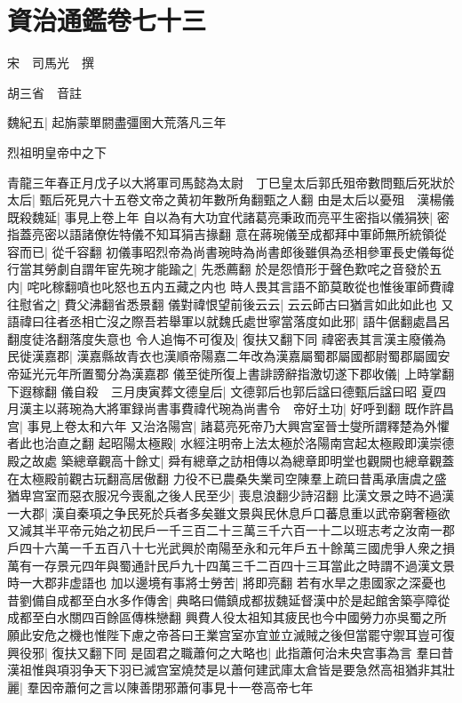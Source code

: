 \chapter{資治通鑑卷七十三}
宋　司馬光　撰

胡三省　音註

魏紀五|{
	起旃蒙單閼盡彊圉大荒落凡三年}


烈祖明皇帝中之下

青龍三年春正月戊子以大將軍司馬懿為太尉　丁巳皇太后郭氏殂帝數問甄后死狀於太后|{
	甄后死見六十五卷文帝之黄初年數所角翻甄之人翻}
由是太后以憂殂　漢楊儀既殺魏延|{
	事見上卷上年}
自以為有大功宜代諸葛亮秉政而亮平生密指以儀狷狹|{
	密指蓋亮密以語諸僚佐特儀不知耳狷吉掾翻}
意在蔣琬儀至成都拜中軍師無所統領從容而已|{
	從千容翻}
初儀事昭烈帝為尚書琬時為尚書郎後雖俱為丞相參軍長史儀每從行當其勞劇自謂年宦先琬才能踰之|{
	先悉薦翻}
於是怨憤形于聲色歎咤之音發於五内|{
	咤叱稼翻噴也叱怒也五内五藏之内也}
時人畏其言語不節莫敢從也惟後軍師費禕往慰省之|{
	費父沸翻省悉景翻}
儀對禕恨望前後云云|{
	云云師古曰猶言如此如此也}
又語禕曰往者丞相亡沒之際吾若舉軍以就魏氏處世寧當落度如此邪|{
	語牛倨翻處昌呂翻度徒洛翻落度失意也}
令人追悔不可復及|{
	復扶又翻下同}
禕密表其言漢主廢儀為民徙漢嘉郡|{
	漢嘉縣故青衣也漢順帝陽嘉二年改為漢嘉屬蜀郡屬國都尉蜀郡屬國安帝延光元年所置蜀分為漢嘉郡}
儀至徙所復上書誹謗辭指激切遂下郡收儀|{
	上時掌翻下遐稼翻}
儀自殺　三月庚寅葬文德皇后|{
	文德郭后也郭后諡曰德甄后諡曰昭}
夏四月漢主以蔣琬為大將軍録尚書事費禕代琬為尚書令　帝好土功|{
	好呼到翻}
既作許昌宫|{
	事見上卷太和六年}
又治洛陽宫|{
	諸葛亮死帝乃大興宫室晉士燮所謂釋楚為外懼者此也治直之翻}
起昭陽太極殿|{
	水經注明帝上法太極於洛陽南宫起太極殿即漢崇德殿之故處}
築總章觀高十餘丈|{
	舜有總章之訪相傳以為總章即明堂也觀闕也總章觀蓋在太極殿前觀古玩翻高居傲翻}
力役不已農桑失業司空陳羣上疏曰昔禹承唐虞之盛猶卑宫室而惡衣服况今喪亂之後人民至少|{
	喪息浪翻少詩沼翻}
比漢文景之時不過漢一大郡|{
	漢自秦項之争民死於兵者多矣雖文景與民休息戶口蕃息重以武帝窮奢極欲又減其半平帝元始之初民戶一千三百二十三萬三千六百一十二以班志考之汝南一郡戶四十六萬一千五百八十七光武興於南陽至永和元年戶五十餘萬三國虎爭人衆之損萬有一存景元四年與蜀通計民戶九十四萬三千二百四十三耳當此之時謂不過漢文景時一大郡非虚語也}
加以邊境有事將士勞苦|{
	將即亮翻}
若有水旱之患國家之深憂也昔劉備自成都至白水多作傳舍|{
	典略曰備鎮成都拔魏延督漢中於是起館舍築亭障從成都至白水關四百餘區傳株戀翻}
興費人役太祖知其疲民也今中國勞力亦吳蜀之所願此安危之機也惟陛下慮之帝荅曰王業宫室亦宜並立滅賊之後但當罷守禦耳豈可復興役邪|{
	復扶又翻下同}
是固君之職蕭何之大略也|{
	此指蕭何治未央宫事為言}
羣曰昔漢祖惟與項羽争天下羽已滅宫室燒焚是以蕭何建武庫太倉皆是要急然高祖猶非其壯麗|{
	羣因帝蕭何之言以陳善閉邪蕭何事見十一卷高帝七年}
